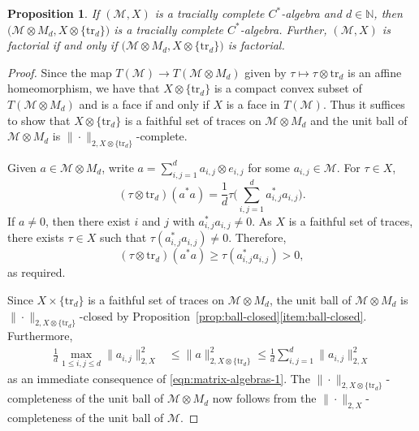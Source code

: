 \documentclass[a4paper,11pt]{amsart}
\newtheorem{proposition}[theorem]{Proposition}
\theoremstyle{definition}
\numberwithin{equation}{section}
\numberwithin{theorem}{section}
\newcommand{\M}{\mathcal{M}}
\begin{document}
\begin{proposition}\label{prop:matrix-algebras}
	If $(\M, X)$ is a tracially complete $C^*$-algebra and $d \in \mathbb N$, then $\big(\M \otimes M_d, X \otimes \{\mathrm{tr}_d\}\big)$ is a tracially complete $C^*$-algebra.  Further, $(\M, X)$ is factorial if and only if $\big(\M \otimes M_d, X \otimes \{\mathrm{tr}_d\}\big)$ is factorial.
\end{proposition}

\begin{proof}
	Since the map $T(\mathcal M) \rightarrow T(\M \otimes M_d)$ given by $\tau \mapsto \tau \otimes \mathrm{tr}_d$ is an affine homeomorphism, we have that $X \otimes \{\mathrm{tr}_d\}$ is a compact convex subset of $T(\M \otimes M_d)$ and is a face if and only if $X$ is a face in $T(\M)$.  Thus it suffices to show that $X \otimes \{\mathrm{tr}_d\}$ is a faithful set of traces on $\mathcal M \otimes M_d$ and the unit ball of $\M\otimes M_d$ is $\|\cdot\|_{2, X \otimes \{\mathrm{tr}_d\}}$-complete.  
 
 Given $a\in\mathcal M\otimes M_d$, write $a=\sum_{i,j=1}^da_{i,j}\otimes e_{i,j}$ for some $a_{i,j}\in\M$.  For $\tau\in X$, 
 \begin{equation}\label{eqn:matrix-algebras-1}
     (\tau\otimes\mathrm{tr}_d)(a^*a)=\frac{1}{d}\tau\Big(\sum_{i,j=1}^da_{i,j}^*a_{i,j}\Big).
 \end{equation}
If $a\neq 0$, then there exist $i$ and $j$ with $a_{i,j}^*a_{i,j}\neq 0$. As $X$ is a faithful set of traces, there exists $\tau\in X$ such that $\tau(a_{i,j}^*a_{i,j})\neq 0$. Therefore, \begin{equation}
    (\tau\otimes\mathrm{tr}_d)(a^*a)\geq \tau(a_{i,j}^*a_{i,j})>0,
\end{equation}
as required.

Since $X\times\{\mathrm{tr}_d\}$ is a faithful set of traces on $\M\otimes M_d$, the unit ball of $\M \otimes M_d$ is $\|\cdot\|_{2, X \otimes \{\mathrm{tr}_d\}}$-closed by Proposition~\ref{prop:ball-closed}\ref{item:ball-closed}.  Furthermore, 
	\begin{equation}\begin{split}
		\frac{1}{d}\max_{1 \leq i, j \leq d} \|a_{i, j}\|^2_{2, X} &\leq \| a \|^2_{2, X \otimes \{\mathrm{tr}_d\}}\leq \frac{1}{d}\sum_{i, j=1}^d \|a_{i, j}\|^2_{2, X}
	\end{split}\end{equation}
as an immediate consequence of \eqref{eqn:matrix-algebras-1}. The $\|\cdot\|_{2, X \otimes \{\mathrm{tr}_d\}}$-completeness of the unit ball of $\M\otimes M_d$ now follows from the $\|\cdot\|_{2, X}$-completeness of the unit ball of $\M$.
\end{proof}
\end{document}
